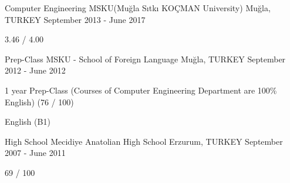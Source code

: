 \begin{cventries}
    \cventry
        {Computer Engineering}
        {MSKU(Muğla Sıtkı KOÇMAN University)}
        {Muğla, TURKEY}
        {September 2013 - June 2017}
        {
            \begin {cvitems}
                \item {3.46 / 4.00}
            \end {cvitems}
        }

    \cventry
        {Prep-Class}
        {MSKU - School of Foreign Language }
        {Muğla, TURKEY}
        {September 2012 - June 2012}
        {
            \begin {cvitems}
                \item {1 year Prep-Class (Courses of Computer Engineering Department are 100\% English) (76 / 100)}
                \item {English (B1)}
            \end {cvitems}
        }
    \cventry
        {High School}
        {Mecidiye Anatolian High School}
        {Erzurum, TURKEY}
        {September 2007 - June 2011}
        {
            \begin {cvitems}
                \item {69 / 100}
            \end {cvitems}
        }

\end{cventries}
